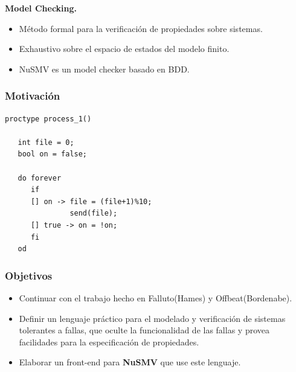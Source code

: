 \documentclass[serif]{beamer}
\begin{document}
\begin{frame}
{\Large \bfseries Model Checking.}
\begin{itemize}\itemsep15pt
\item Método formal para la verificación de propiedades sobre sistemas.
\item Exhaustivo sobre el espacio de estados del modelo finito.
\item NuSMV es un model checker basado en BDD.
\end{itemize}
\end{frame}


\begin{frame}[fragile]
\frametitle{Motivación}
{\fontsize{9pt}{13pt}\selectfont
\hspace{0.2\textwidth}
\begin{minipage}{0.6\textwidth}
\begin{framed}
\begin{verbatim}
proctype process_1()

   int file = 0;
   bool on = false;

   do forever
      if
      [] on -> file = (file+1)%10;
               send(file);
      [] true -> on = !on;
      fi
   od
\end{verbatim}
\end{framed}
\end{minipage}
} %
\end{frame}

\begin{frame}
\frametitle{Objetivos}
\begin{itemize}\itemsep15pt
\item Continuar con el trabajo hecho en Falluto(Hames) y Offbeat(Bordenabe). 
\item Definir un lenguaje práctico para el modelado y verificación de 
sistemas tolerantes a fallas, que oculte la funcionalidad de las 
fallas y provea facilidades para la especificación de propiedades.
\item Elaborar un front-end para \textbf{NuSMV} que use este lenguaje.
\end{itemize}
\end{frame}
\end{document}
